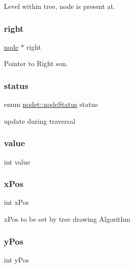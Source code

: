 Level within tree, node is present at. 

\hypertarget{structnodet_ae274df3c21d52825564b9811fa84f71b}{}\label{structnodet_ae274df3c21d52825564b9811fa84f71b} 
\subsubsection{\texorpdfstring{right}{right}}
{\footnotesize\ttfamily \hyperlink{binary_tree_w_s_8h_aafd781b4673cf2585cd9a156aebd08de}{node} $\ast$ right}



Pointer to Right son. 

\hypertarget{structnodet_a4e847ae7c57663719cc9cfebfbbfe191}{}\label{structnodet_a4e847ae7c57663719cc9cfebfbbfe191} 
\subsubsection{\texorpdfstring{status}{status}}
{\footnotesize\ttfamily enum \hyperlink{structnodet_aab296cc56fa34a05b7d9d632a9ddef2a}{nodet\+::node\+Status}
                     status}

update during traversal \hypertarget{structnodet_ac4f474c82e82cbb89ca7c36dd52be0ed}{}\label{structnodet_ac4f474c82e82cbb89ca7c36dd52be0ed} 
\subsubsection{\texorpdfstring{value}{value}}
{\footnotesize\ttfamily int value}

\hypertarget{structnodet_a6806e78862b165988ca9b855e230084e}{}\label{structnodet_a6806e78862b165988ca9b855e230084e} 
\subsubsection{\texorpdfstring{x\+Pos}{xPos}}
{\footnotesize\ttfamily int x\+Pos}



x\+Pos to be set by tree drawing Algorithm 

\hypertarget{structnodet_adbae1d6f68d046bbecaa7230baf64762}{}\label{structnodet_adbae1d6f68d046bbecaa7230baf64762} 
\subsubsection{\texorpdfstring{y\+Pos}{yPos}}
{\footnotesize\ttfamily int y\+Pos}



